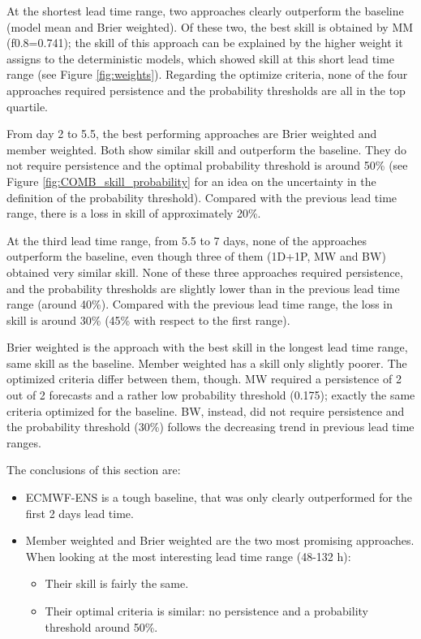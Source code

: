 \documentclass[preprint,12pt]{elsarticle}
\begin{document}
At the shortest lead time range, two approaches clearly outperform the baseline (model mean and Brier weighted). Of these two, the best skill is obtained by MM (f0.8=0.741); the skill of this approach can be explained by the higher weight it assigns to the deterministic models, which showed skill at this short lead time range (see Figure \ref{fig:weights}). Regarding the optimize criteria, none of the four approaches required persistence and the probability thresholds are all in the top quartile.

From day 2 to 5.5, the best performing approaches are Brier weighted and member weighted. Both show similar skill and outperform the baseline. They do not require persistence and the optimal probability threshold is around 50\% (see Figure \ref{fig:COMB_skill_probability} for an idea on the uncertainty in the definition of the probability threshold). Compared with the previous lead time range, there is a loss in skill of approximately 20\%.

At the third lead time range, from 5.5 to 7 days, none of the approaches outperform the baseline, even though three of them (1D+1P, MW and BW) obtained very similar skill. None of these three approaches required persistence, and the probability thresholds are slightly lower than in the previous lead time range (around 40\%). Compared with the previous lead time range, the loss in skill is around 30\% (45\% with respect to the first range).

Brier weighted is the approach with the best skill in the longest lead time range, same skill as the baseline. Member weighted has a skill only slightly poorer. The optimized criteria differ between them, though. MW required a persistence of 2 out of 2 forecasts and a rather low probability threshold (0.175); exactly the same criteria optimized for the baseline. BW, instead, did not require persistence and the probability threshold (30\%) follows the decreasing trend in previous lead time ranges.

The conclusions of this section are:

\begin{itemize}
    \item ECMWF-ENS is a tough baseline, that was only clearly outperformed for the first 2 days lead time.
    \item Member weighted  and Brier weighted  are the two most promising approaches. When looking at the most interesting lead time range (48-132 h):
    \begin{itemize}
        \item Their skill is fairly the same.
        \item Their optimal criteria is similar: no persistence and a probability threshold around 50\%.
    \end{itemize}
\end{itemize}  
\end{document}
